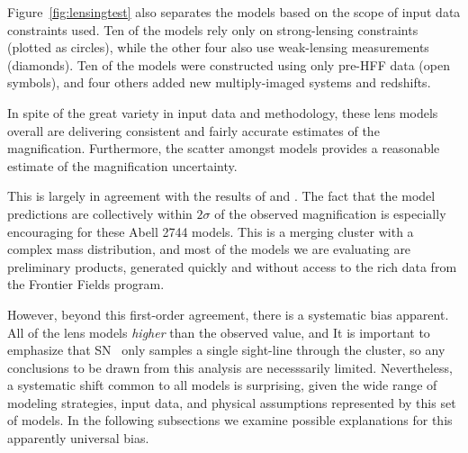 
Figure~\ref{fig:lensingtest} also separates the models based on the
scope of input data constraints used.  Ten of the models rely only
on strong-lensing constraints (plotted as circles), while the other
four also use weak-lensing measurements (diamonds).  Ten of the
models were constructed using only pre-HFF data (open symbols), and
four others added new multiply-imaged systems and redshifts.

In spite of the great variety in input data and methodology, these
lens models overall are delivering consistent and fairly accurate
estimates of the magnification.    Furthermore, the scatter
amongst models provides a reasonable estimate of the magnification
uncertainty.

This is largely in agreement with the results
of  and \citet{Nordin:2014}.  The fact that the
model predictions are collectively within $2\sigma$ of the observed
magnification is especially encouraging for these Abell 2744
models. This is a merging cluster with a complex mass distribution,
and most of the models we are evaluating are preliminary products,
generated quickly and without access to the rich data from the
Frontier Fields program.

However, beyond this first-order agreement, there is a systematic bias
apparent. All of the lens models  {\it higher} than the observed value, and   It is important to
emphasize that SN \tomas\ only samples a single sight-line through the
cluster, so any conclusions to be drawn from this analysis are
necesssarily limited.  Nevertheless, a systematic shift common to all
models is surprising, given the wide range of modeling strategies,
input data, and physical assumptions represented by this set of
models.  In the following subsections we examine possible explanations
for this  apparently universal bias.

